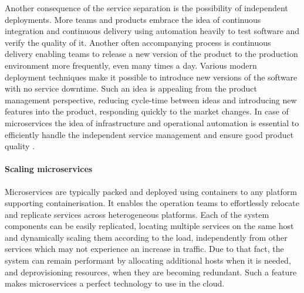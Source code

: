 Another consequence of the service separation is the possibility of independent deployments. More teams and products embrace the idea of continuous integration and continuous delivery using automation heavily to test software and verify the quality of it. Another often accompanying process is continuous delivery enabling teams to release a new version of the product to the production environment more frequently, even many times a day. Various modern deployment techniques make it possible to introduce new versions of the software with no service downtime. Such an idea is appealing from the product management perspective, reducing cycle-time between ideas and introducing new features into the product, responding quickly to the market changes. In case of microservices the idea of infrastructure and operational automation is essential to efficiently handle the independent service management and ensure good product quality \cite{FowlerMicroservicesTradeoffs}.

\paragraph{Scaling microservices}

Microservices are typically packed and deployed using containers to any platform supporting containerisation. It enables the operation teams to effortlessly relocate and replicate services across heterogeneous platforms. Each of the system components can be easily replicated, locating multiple services on the same host and dynamically scaling them according to the load, independently from other services which may not experience an increase in traffic. Due to that fact, the system can remain performant by allocating additional hosts when it is needed, and deprovisioning resources, when they are becoming redundant. Such a feature makes microservices a perfect technology to use in the cloud.

